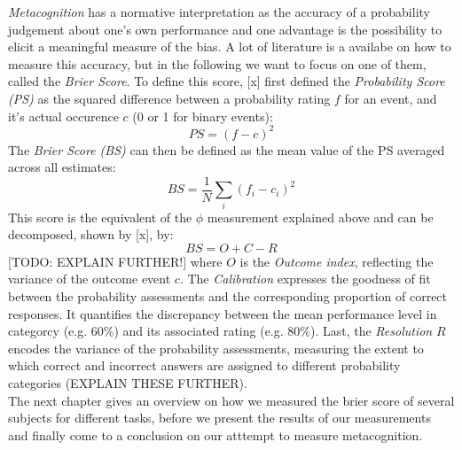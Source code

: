 \documentclass[../main/main.tex]{subfiles}
\begin{document}
	\textit{Metacognition} has a normative interpretation as the accuracy of a probability judgement about one's own performance and one advantage is the possibility to elicit a meaningful measure of the bias. A lot of literature is a availabe on how to measure this accuracy, but in the following we want to focus on one of them, called the \textit{Brier Score}. To define this score, [x] first defined the \textit{Probability Score (PS)} as the squared difference between a probability rating $f$ for an event, and it's actual occurence $c$ (0 or 1 for binary events):
	\begin{displaymath}
			PS = (f - c)^2
	\end{displaymath}
	The \textit{Brier Score (BS)} can then be defined as the mean value of the PS averaged across all estimates:
	\begin{displaymath}
			BS = \frac{1}{N}\sum_i(f_i - c_i)^2
	\end{displaymath}
	This score is the equivalent of the $\phi$ measurement explained above and can be decomposed, shown by [x], by:
	\begin{displaymath}
		BS = O + C - R
	\end{displaymath}
	[TODO: EXPLAIN FURTHER!]
	where $O$ is the \textit{Outcome index}, reflecting the variance of the outcome event $c$. The \textit{Calibration} expresses the goodness of fit between the probability assessments and the corresponding proportion of correct responses. It quantifies the discrepancy between the mean performance level in categorcy (e.g. $60\%$) and its associated rating (e.g. $80\%$). Last, the \textit{Resolution} $R$ encodes the variance of the probability assessments, measuring the extent to which correct and incorrect answers are assigned to different probability categories (EXPLAIN THESE FURTHER).\\
	The next chapter gives an overview on how we measured the brier score of several subjects for different tasks, before we present the results of our measurements and finally come to a conclusion on our atttempt to measure metacognition.
	
\end{document}
